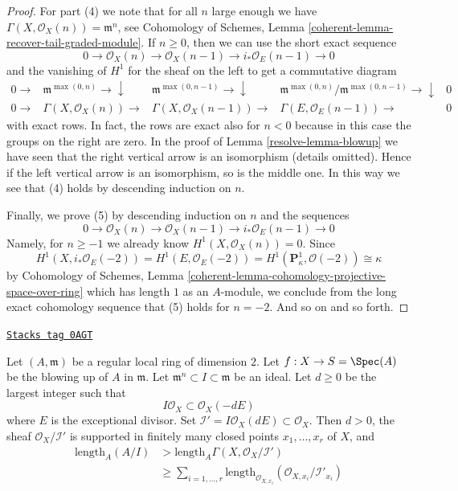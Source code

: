 \begin{proof}
\medskip\noindent
For part (4) we note that for all $n$ large enough we have
$\Gamma(X, \mathcal{O}_X(n)) = \mathfrak m^n$, see
Cohomology of Schemes, Lemma \ref{coherent-lemma-recover-tail-graded-module}.
If $n \geq 0$, then we can use the short exact sequence
$$
0 \to \mathcal{O}_X(n) \to \mathcal{O}_X(n - 1) \to
i_*\mathcal{O}_E(n - 1) \to 0
$$
and the vanishing of $H^1$ for the sheaf on the left to get a commutative
diagram
$$
\begin{array}{ccccc}0 \longrightarrow & \mathfrak m^{\max(0, n)} \longrightarrow\downarrow & \mathfrak m^{\max(0, n - 1)} \longrightarrow\downarrow & \mathfrak m^{\max(0, n)}/\mathfrak m^{\max(0, n - 1)} \longrightarrow\downarrow & 0 \\ 0 \longrightarrow & \Gamma(X, \mathcal{O}_X(n)) \longrightarrow & \Gamma(X, \mathcal{O}_X(n - 1)) \longrightarrow & \Gamma(E, \mathcal{O}_E(n - 1)) \longrightarrow & 0\end{array}
$$
with exact rows. In fact, the rows are exact also for $n < 0$
because in this case the groups on the right are zero.
In the proof of Lemma \ref{resolve-lemma-blowup}
we have seen that the right vertical arrow is an isomorphism
(details omitted). Hence if the left vertical arrow is an isomorphism, so
is the middle one. In this way we see that (4) holds by
descending induction on $n$.

\medskip\noindent
Finally, we prove (5) by descending induction on $n$ and the sequences
$$
0 \to \mathcal{O}_X(n) \to \mathcal{O}_X(n - 1) \to
i_*\mathcal{O}_E(n - 1) \to 0
$$
Namely, for $n \geq -1$ we already know $H^1(X, \mathcal{O}_X(n)) = 0$.
Since
$$
H^1(X, i_*\mathcal{O}_E(-2)) =
H^1(E, \mathcal{O}_E(-2)) =
H^1(\mathbf{P}^1_\kappa, \mathcal{O}(-2)) \cong \kappa
$$
by Cohomology of Schemes, Lemma
\ref{coherent-lemma-cohomology-projective-space-over-ring}
which has length $1$ as an $A$-module, we conclude from the long exact
cohomology sequence that (5) holds for $n = -2$. And so on and so forth.
\end{proof}

\begin{lemma}
\label{resolve-lemma-blowup-improve}
\href{https://stacks.math.columbia.edu/tag/0AGT}{\texttt{Stacks tag 0AGT}}

Let $(A, \mathfrak m)$ be a regular local ring of dimension $2$.
Let $f : X \to S = \Spec(A)$ be the blowing up of $A$ in $\mathfrak m$.
Let $\mathfrak m^n \subset I \subset \mathfrak m$ be an ideal.
Let $d \geq 0$ be the largest integer such that
$$
I \mathcal{O}_X \subset \mathcal{O}_X(-dE)
$$
where $E$ is the exceptional divisor. Set
$\mathcal{I}' = I\mathcal{O}_X(dE) \subset \mathcal{O}_X$.
Then $d > 0$, the sheaf
$\mathcal{O}_X/\mathcal{I}'$ is supported in finitely many
closed points $x_1, \ldots, x_r$ of $X$, and
\begin{align*}
\text{length}_A(A/I)
& >
\text{length}_A \Gamma(X, \mathcal{O}_X/\mathcal{I}') \\
& \geq
\sum\nolimits_{i = 1, \ldots, r}
\text{length}_{\mathcal{O}_{X, x_i}}
(\mathcal{O}_{X, x_i}/\mathcal{I}'_{x_i})
\end{align*}
\end{lemma}

